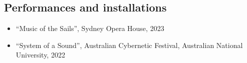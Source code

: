 \subsection*{Performances and installations}

\begin{itemize}
    \item ``Music of the Sails'', Sydney Opera House, 2023
    \item ``System of a Sound'', Australian Cybernetic Festival, Australian National University, 2022
\end{itemize}




